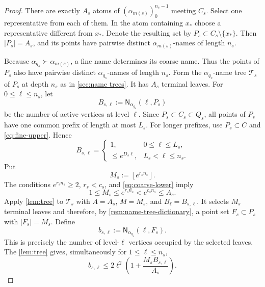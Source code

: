 \documentclass[10pt,a4paper]{amsart}
\newcommand{\Nname}{\mathsf N}
\numberwithin{equation}{section}
\begin{document}
\begin{proof}
		There are exactly $A_s$ atoms of $(\alpha_{m(s)})_0^{n_s-1}$ meeting
		$C_s$.  Select one representative from each of them.  In the atom containing
		$x_*$ choose a representative different from $x_*$. 
	    Denote the resulting
		set by $P_s\subset C_s\setminus\{x_*\}$.  Then $|P_s|=A_s$, and its points
		have pairwise distinct $\alpha_{m(s)}$-names of length $n_s$.
		
		Because $\alpha_{q_s}\succ\alpha_{m(s)}$, a fine name determines its
		coarse name.  Thus the points of $P_s$ also have pairwise distinct
		$\alpha_{q_s}$-names of length $n_s$.  Form the $\alpha_{q_s}$-name tree
		$\mathcal T_s$ of $P_s$ at depth $n_s$ as in
		\cref{sec:name trees}.  It has $A_s$ terminal leaves.  For
		$0\leq\ell\leq n_s$, let
		\[
			B_{s,\ell}
			:=
			\Nname_{\alpha_{q_s}}(\ell,P_s)
		\]
		be the number of active vertices at level $\ell$.  Since
		$P_s\subset C_s\subset Q_s$, all points of $P_s$ have one common prefix of
		length at most $L_s$.  For longer prefixes, use $P_s\subset C$ and
		\eqref{eq:fine-upper}.  Hence
		\begin{equation}
			B_{s,\ell}=
			\begin{cases}
				1, & 0\leq\ell\leq L_s,\\
				\leq e^{D_s\ell}, & L_s<\ell\leq n_s.
			\end{cases}
			\label{eq:prefix-count}
		\end{equation}
		Put
		\begin{equation}
			M_s:=\left\lfloor e^{r_sn_s}\right\rfloor.
			\label{eq:Ms}
		\end{equation}
		The conditions $e^{r_sn_s}\geq2$, $r_s<c_s$, and
		\eqref{eq:coarse-lower} imply
		\[
			1\leq M_s\leq e^{r_sn_s}<e^{c_sn_s}\leq A_s.
		\]
		Apply \cref{lem:tree} to $\mathcal T_s$ with
		$A=A_s$, $M=M_s$, and $B_\ell=B_{s,\ell}$.  It selects $M_s$ terminal
		leaves and therefore, by \cref{rem:name-tree-dictionary}, a point set
		$F_s\subset P_s$ with $|F_s|=M_s$.  Define
		\[
			b_{s,\ell}
			:=
			\Nname_{\alpha_{q_s}}(\ell,F_s).
		\]
		This is precisely the number of level-$\ell$ vertices occupied by the
		selected leaves.  The \cref{lem:tree} gives, simultaneously for
		$1\leq\ell\leq n_s$,
		\begin{equation}
			b_{s,\ell}
			\leq
			2\ell^2\left(1+\frac{M_sB_{s,\ell}}{A_s}\right).
			\label{eq:stage-tree-bound}
		\end{equation}
		

\end{proof}
\end{document}
